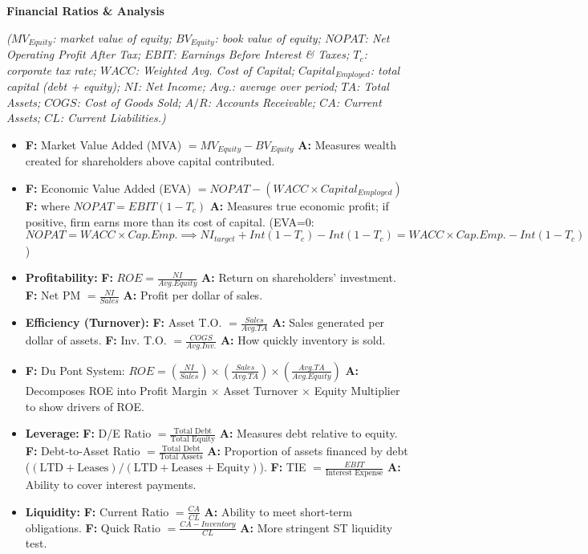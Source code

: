 \documentclass[7pt,landscape]{extarticle} %
\newcommand{\cheatsheetsubsubsection}[1]{%
  \vspace{0.15ex plus 0.05ex minus 0.05ex}%
  \noindent\textbf{\sffamily\scriptsize #1}%
  \par\vspace{0.05ex}%
}
\newcommand{\F}[1]{\textbf{\textcolor{FormColor}{F:}} #1}
\newcommand{\A}[1]{\textbf{\textcolor{AppColor}{A:}} #1}
\newcommand{\SF}[1]{\textit{\small (#1)}} %
\begin{document}
\begin{multicols*}{4}
  \cheatsheetsubsubsection{Financial Ratios \& Analysis}
  \SF{$MV_{Equity}$: market value of equity; $BV_{Equity}$: book value of equity; $NOPAT$: Net Operating Profit After Tax; $EBIT$: Earnings Before Interest \& Taxes; $T_c$: corporate tax rate; $WACC$: Weighted Avg. Cost of Capital; $Capital_{Employed}$: total capital (debt + equity); $NI$: Net Income; $Avg.$: average over period; $TA$: Total Assets; $COGS$: Cost of Goods Sold; $A/R$: Accounts Receivable; $CA$: Current Assets; $CL$: Current Liabilities.}
  \begin{itemize}
    \item \F{Market Value Added (MVA) $= MV_{Equity} - BV_{Equity}$}
          \A{Measures wealth created for shareholders above capital contributed.}
    \item \F{Economic Value Added (EVA) $= NOPAT - (WACC \times Capital_{Employed})$}
          \F{where $NOPAT = EBIT(1-T_c)$}
          \A{Measures true economic profit; if positive, firm earns more than its cost of capital. (EVA=0: $NOPAT = WACC \times Cap. Emp. \implies NI_{target} + Int(1-T_c) - Int(1-T_c) = WACC \times Cap.Emp. - Int(1-T_c)$)}
    \item \textbf{Profitability:}
        \F{$ROE = \frac{NI}{Avg.Equity}$} \A{Return on shareholders' investment.}
        \F{Net PM $= \frac{NI}{Sales}$} \A{Profit per dollar of sales.}
    \item \textbf{Efficiency (Turnover):}
        \F{Asset T.O. $= \frac{Sales}{Avg.TA}$} \A{Sales generated per dollar of assets.}
        \F{Inv. T.O. $= \frac{COGS}{Avg.Inv.}$} \A{How quickly inventory is sold.}
    \item \F{Du Pont System: $ROE = (\frac{NI}{Sales}) \times (\frac{Sales}{Avg.TA}) \times (\frac{Avg.TA}{Avg.Equity})$}
          \A{Decomposes ROE into Profit Margin $\times$ Asset Turnover $\times$ Equity Multiplier to show drivers of ROE.}
    \item \textbf{Leverage:}
        \F{D/E Ratio $= \frac{\text{Total Debt}}{\text{Total Equity}}$} \A{Measures debt relative to equity.}
        \F{Debt-to-Asset Ratio $= \frac{\text{Total Debt}}{\text{Total Assets}}$} \A{Proportion of assets financed by debt ($(\text{LTD}+\text{Leases}) / (\text{LTD}+\text{Leases}+\text{Equity})$).}
        \F{TIE $= \frac{EBIT}{\text{Interest Expense}}$} \A{Ability to cover interest payments.}
    \item \textbf{Liquidity:}
        \F{Current Ratio $= \frac{CA}{CL}$} \A{Ability to meet short-term obligations.}
        \F{Quick Ratio $= \frac{CA-Inventory}{CL}$} \A{More stringent ST liquidity test.}

\end{itemize}
\end{multicols*}
\end{document}
